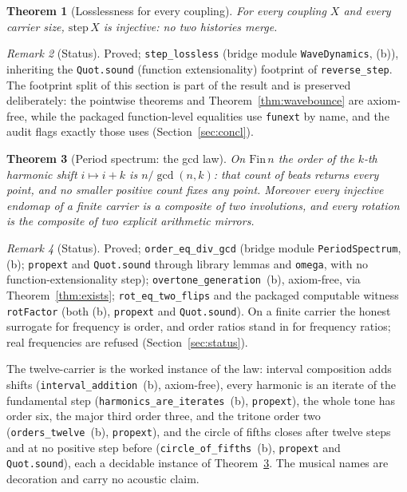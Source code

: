 \documentclass[11pt,a4paper]{article}
\theoremstyle{plain}
\newtheorem{theorem}{Theorem}[section]
\theoremstyle{definition}
\theoremstyle{remark}
\newtheorem{remark}[theorem]{Remark}
\begin{document}
\begin{theorem}[Losslessness for every coupling]
\label{thm:wavelossless}
For every coupling $X$ and every carrier size, $\mathrm{step}\,X$ is
injective: no two histories merge.
\end{theorem}

\begin{remark}[Status]
Proved; \texttt{step\_lossless} (bridge module
\texttt{WaveDynamics}, (b)), inheriting the \texttt{Quot.sound}
(function extensionality) footprint of \texttt{reverse\_step}. The footprint split of this section is part of
the result and is preserved deliberately: the pointwise theorems and
Theorem~\ref{thm:wavebounce} are axiom-free, while the packaged
function-level equalities use \texttt{funext} by name, and the audit
flags exactly those uses (Section~\ref{sec:concl}).
\end{remark}

\begin{theorem}[Period spectrum: the gcd law]
\label{thm:gcd}
On $\mathrm{Fin}\,n$ the order of the $k$-th harmonic shift
$i\mapsto i+k$ is $n/\gcd(n,k)$: that count of beats returns every
point, and no smaller positive count fixes any point. Moreover every
injective endomap of a finite carrier is a composite of two
involutions, and every rotation is the composite of two explicit
arithmetic mirrors.
\end{theorem}

\begin{remark}[Status]
Proved; \texttt{order\_eq\_div\_gcd} (bridge module
\texttt{PeriodSpectrum}, (b); \texttt{propext} and
\texttt{Quot.sound} through library lemmas and \texttt{omega}, with
no function-extensionality step);
\texttt{overtone\_generation}~(b), axiom-free, via
Theorem~\ref{thm:exists}; \texttt{rot\_eq\_two\_flips} and the
packaged computable witness \texttt{rotFactor} (both (b),
\texttt{propext} and \texttt{Quot.sound}). On a finite carrier the
honest surrogate for frequency is order, and order ratios stand in
for frequency ratios; real frequencies are refused
(Section~\ref{sec:status}).
\end{remark}

The twelve-carrier is the worked instance of the law: interval
composition adds shifts
(\texttt{interval\_addition}~(b), axiom-free), every harmonic is an
iterate of the fundamental step
(\texttt{harmonics\_are\_iterates}~(b), \texttt{propext}), the whole
tone has order six, the major third order three, and the tritone
order two (\texttt{orders\_twelve}~(b), \texttt{propext}), and the
circle of fifths closes after twelve steps and at no positive step
before (\texttt{circle\_of\_fifths}~(b), \texttt{propext} and
\texttt{Quot.sound}), each a decidable instance of
Theorem~\ref{thm:gcd}. The musical names are decoration and carry no
acoustic claim.
\end{document}
